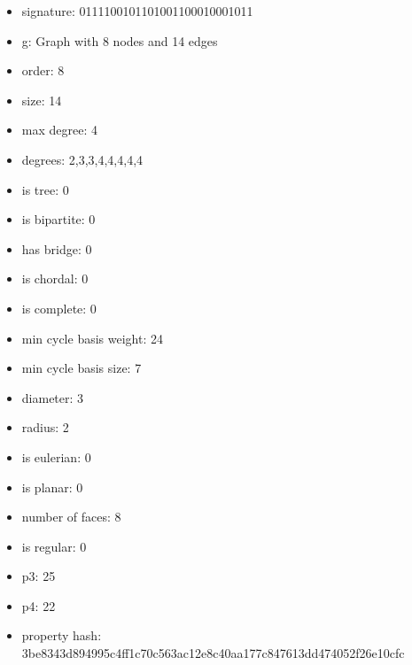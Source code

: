 \begin{itemize}
\item signature: 0111100101101001100010001011
\item g: Graph with 8 nodes and 14 edges
\item order: 8
\item size: 14
\item max degree: 4
\item degrees: 2,3,3,4,4,4,4,4
\item is tree: 0
\item is bipartite: 0
\item has bridge: 0
\item is chordal: 0
\item is complete: 0
\item min cycle basis weight: 24
\item min cycle basis size: 7
\item diameter: 3
\item radius: 2
\item is eulerian: 0
\item is planar: 0
\item number of faces: 8
\item is regular: 0
\item p3: 25
\item p4: 22
\item property hash: 3be8343d894995c4ff1c70c563ac12e8c40aa177c847613dd474052f26e10cfc
\end{itemize}
\newpage
\begin{figure}
\end{figure}
